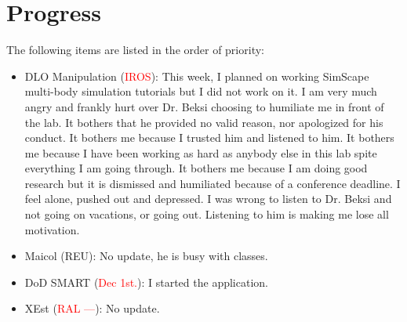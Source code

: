 \documentclass[11pt]{article}
\begin{document}
\section{Progress}
The following items are listed in the order of priority:
\begin{itemize}
    \item DLO Manipulation (\textcolor{red}{IROS}):
    This week, I planned on working SimScape multi-body simulation tutorials
    but I did not work on it. I am very much angry and frankly hurt over Dr.
    Beksi choosing to humiliate me in front of the lab. It bothers that he
    provided no valid reason, nor apologized for his conduct. It bothers me
    because I trusted him and listened to him. It bothers me because I have
    been working as hard as anybody else in this lab spite everything I am
    going through. It bothers me because I am doing good research but it is
    dismissed and humiliated because of a conference deadline. I feel alone,
    pushed out and depressed. I was wrong to listen to Dr. Beksi and not going
    on vacations, or going out. Listening to him is making me lose all
    motivation. \\
    \item Maicol (REU): No update, he is busy with classes.\\
    \item DoD SMART (\textcolor{red}{Dec 1st.}): I started the application.\\
    \item XEst (\textcolor{red}{RAL ---}): No update.\\
  \end{itemize}
\newpage

\newpage


\end{document}
